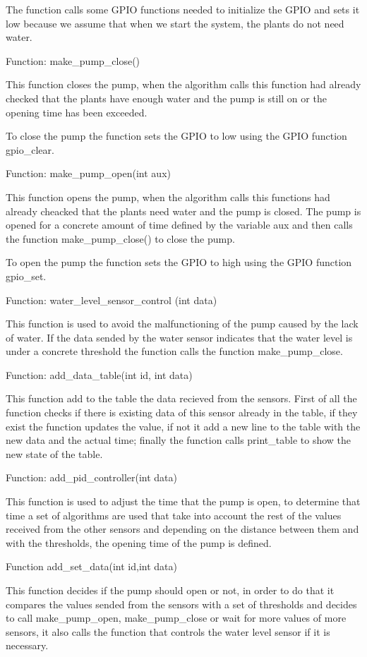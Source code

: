 \documentclass[11pt,paper=a4,parskip=half]{scrartcl}
\begin{document}
The function calls some GPIO functions needed to initialize the GPIO and sets it low because we assume that when we start the system, the plants do not need water.

Function: make\_pump\_close()

This function closes the pump, when the algorithm calls this function had already checked that the plants have enough water and the pump is still on or the opening time has been exceeded.

To close the pump the function sets the GPIO to low using the GPIO function gpio\_clear.

Function: make\_pump\_open(int aux)

This function opens the pump, when the algorithm calls this functions had already cheacked that the plants need water and the pump is closed. The pump is opened for a concrete amount of time defined by the variable aux and then calls the function make\_pump\_close() to close the pump.

To open the pump the function sets the GPIO to high using the GPIO function gpio\_set.

Function: water\_level\_sensor\_control (int data)

This function is used to avoid the malfunctioning of the pump caused by the lack of water. If the data sended by the water sensor indicates that the water level is under a concrete threshold the function calls the function make\_pump\_close.

Function: add\_data\_table(int id, int data)

This function add to the table the data recieved from the sensors. First of all the function checks if there is existing data of this sensor already in the table, if they exist the function updates the value, if not it add a new line to the table with the new data and the actual time; finally the function calls print\_table to show the new state of the table.

Function: add\_pid\_controller(int data)

This function is used to adjust the time that the pump is open, to determine that time a set of algorithms are used that take into account the rest of the values received from the other sensors and depending on the distance between them and with the thresholds, the opening time of the pump is defined.

Function add\_set\_data(int id,int data)

This function decides if the pump should open or not, in order to do that it compares the values sended from the sensors with a set of thresholds and decides to call make\_pump\_open, make\_pump\_close or wait for more values of more sensors, it also calls the function that controls the water level sensor if it is necessary.
\end{document}
